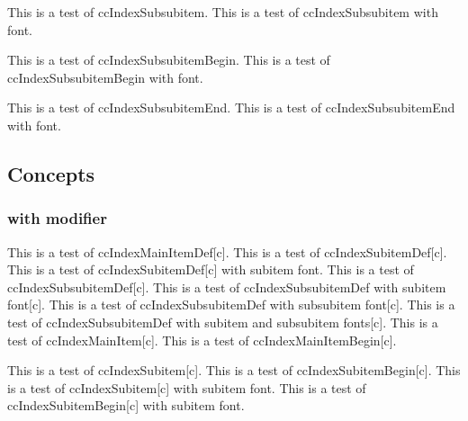 \documentclass{article}
\begin{document}
{{{{This is a test of ccIndexSubsubitem.
This is a test of ccIndexSubsubitem with font.

This is a test of ccIndexSubsubitemBegin.
This is a test of ccIndexSubsubitemBegin with font.

\pagebreak
This is a test of ccIndexSubsubitemEnd.
This is a test of ccIndexSubsubitemEnd with font.



\pagebreak


\subsection{Concepts}

\subsubsection{with modifier}

This is a test of ccIndexMainItemDef[c].
This is a test of ccIndexSubitemDef[c].
This is a test of ccIndexSubitemDef[c] with subitem font.
This is a test of ccIndexSubsubitemDef[c].
This is a test of ccIndexSubsubitemDef with subitem font[c].
This is a test of ccIndexSubsubitemDef with subsubitem font[c].
This is a test of ccIndexSubsubitemDef with subitem and subsubitem fonts[c].
\pagebreak
This is a test of ccIndexMainItem[c].
This is a test of ccIndexMainItemBegin[c].

This is a test of ccIndexSubitem[c].
This is a test of ccIndexSubitemBegin[c].
This is a test of ccIndexSubitem[c] with subitem font.
This is a test of ccIndexSubitemBegin[c] with subitem font.

}}}}
\end{document}
